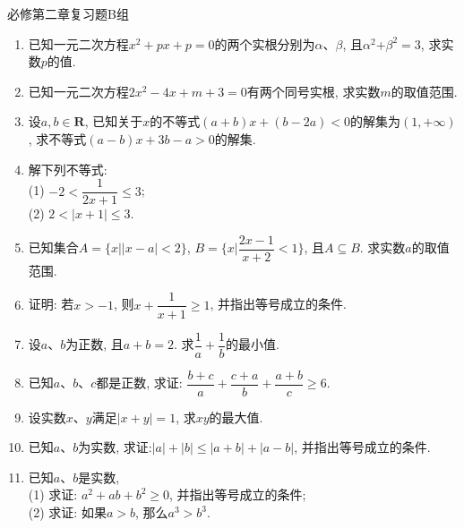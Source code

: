 \documentclass[10pt,a4paper]{article}
\begin{document}
必修第二章复习题B组
\begin{enumerate}[1.]

\item 已知一元二次方程$x^2+px+p=0$的两个实根分别为$\alpha$、$\beta$, 且$\alpha^2$+$\beta^2=3$, 求实数$p$的值.
\vspace*{3cm}
\item 已知一元二次方程$2x^2-4x+m+3=0$有两个同号实根, 求实数$m$的取值范围.
\vspace*{3cm}
\item 设$a,b\in \mathbf{R}$, 已知关于$x$的不等式$(a+b)x+(b-2a)<0$的解集为$(1, +\infty)$, 求不等式$(a-b)x+3b-a>0$的解集.
\vspace*{3cm}
\item 解下列不等式:\\
(1) $-2< \dfrac 1{2x+1}\le 3$;\\
(2) $2<|x+1|\le 3$.
\vspace*{3cm}
\item 已知集合$A=\{x||x-a|<2\}$, $B=\{x|\dfrac{2x-1}{x+2}<1\}$, 且$A\subseteq B$. 求实数$a$的取值范围.
\vspace*{3cm}
\item 证明: 若$x>-1$, 则$x+\dfrac 1{x+1}\ge 1$, 并指出等号成立的条件.
\vspace*{3cm}
\item 设$a$、$b$为正数, 且$a+b=2$. 求$\dfrac 1a+\dfrac 1b$的最小值.
\vspace*{3cm}
\item 已知$a$、$b$、$c$都是正数, 求证: $\dfrac{b+c}{a}+\dfrac{c+a}{b}+\dfrac{a+b}{c}\ge 6$.
\vspace*{3cm}
\item 设实数$x$、$y$满足$|x+y|=1$, 求$xy$的最大值.
\vspace*{3cm}
\item 已知$a$、$b$为实数, 求证:$|a|+|b| \le |a+b| +|a-b|$, 并指出等号成立的条件.
\vspace*{3cm}
\item 已知$a$、$b$是实数,\\
(1) 求证: $a^2+ab+b^2\ge 0$, 并指出等号成立的条件;\\
(2) 求证: 如果$a>b$, 那么$a^3>b^3$. 
\vspace*{3cm}
\end{enumerate}
\end{document}
